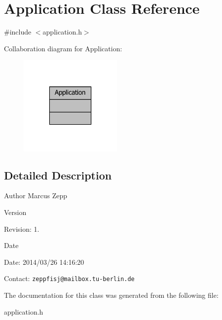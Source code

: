\section{Application Class Reference}
\label{classApplication}


{\ttfamily \#include $<$application.\-h$>$}



Collaboration diagram for Application\-:
\nopagebreak
\begin{figure}[H]
\begin{center}
\leavevmode
\includegraphics[width=142pt]{dd/d78/classApplication__coll__graph}
\end{center}
\end{figure}


\subsection{Detailed Description}
\begin{DoxyAuthor}{Author}
Marcus Zepp
\end{DoxyAuthor}
\begin{DoxyVersion}{Version}

\end{DoxyVersion}
\begin{DoxyParagraph}{Revision\-:}
1. 
\end{DoxyParagraph}


\begin{DoxyDate}{Date}

\end{DoxyDate}
\begin{DoxyParagraph}{Date\-:}
2014/03/26 14\-:16\-:20 
\end{DoxyParagraph}


Contact\-: {\tt zeppfisj@mailbox.\-tu-\/berlin.\-de} 

The documentation for this class was generated from the following file\-:\begin{DoxyCompactItemize}
\item 
application.\-h\end{DoxyCompactItemize}
